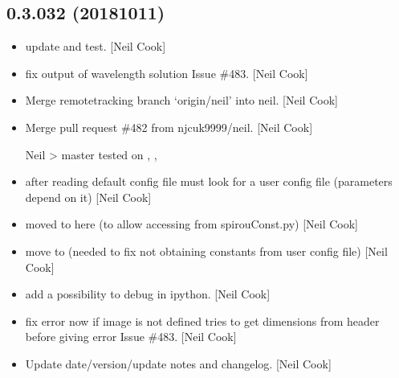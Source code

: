 \documentclass[a4paper,10pt,english]{report}
\begin{document}
\subsection{0.3.032 (2018\sphinxhyphen{}10\sphinxhyphen{}11)}
\label{\detokenize{misc/changelog:id317}}\begin{itemize}
\item {} 
 \sphinxhyphen{} update  and test. {[}Neil Cook{]}

\item {} 
 \sphinxhyphen{} fix output of wavelength solution \sphinxhyphen{} Issue \#483. {[}Neil
Cook{]}

\item {} 
Merge remote\sphinxhyphen{}tracking branch ‘origin/neil’ into neil. {[}Neil Cook{]}

\item {} 
Merge pull request \#482 from njcuk9999/neil. {[}Neil Cook{]}

Neil \textendash{}\textgreater{} master \sphinxhyphen{} tested on , , 

\item {} 
 \sphinxhyphen{} after reading default config file must look for a
user config file (parameters depend on it) {[}Neil Cook{]}

\item {} 
 \sphinxhyphen{} moved  to here (to allow
accessing from spirouConst.py) {[}Neil Cook{]}

\item {} 
 \sphinxhyphen{} move  to  \sphinxhyphen{}
(needed to fix not obtaining constants from user config file) {[}Neil
Cook{]}

\item {} 
 \sphinxhyphen{} add a possibility to debug in ipython. {[}Neil Cook{]}

\item {} 
 \sphinxhyphen{} fix error \sphinxhyphen{} now if image is not defined tries to get
dimensions from header before giving error \sphinxhyphen{} Issue \#483. {[}Neil Cook{]}

\item {} 
Update date/version/update notes and changelog. {[}Neil Cook{]}

\end{itemize}
\end{document}
